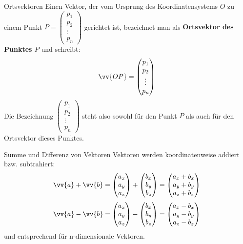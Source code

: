\begin{frame}{Ortsvektoren}
	Einen Vektor, der vom Ursprung des Koordinatensystems $O$ zu einem Punkt $P=\begin{pmatrix}p_1 \\ p_2 \\ \vdots \\ p_n \end{pmatrix}$ gerichtet ist, bezeichnet man als \textbf{Ortsvektor des Punktes $P$} und schreibt:
	\[
		\vv{OP} = \begin{pmatrix}
		p_1 \\ p_2 \\ \vdots \\ p_n
		\end{pmatrix}
	\]
	Die Bezeichnung $\begin{pmatrix}
	p_1 \\ p_2 \\ \vdots \\ p_n
	\end{pmatrix}$
	steht also sowohl für den Punkt $P$ als auch für den Ortsvektor dieses Punktes.
\end{frame}


\begin{frame}{Summe und Differenz von Vektoren}
	Vektoren werden koordinatenweise addiert bzw. subtrahiert:
	\[
	\vv{a} + \vv{b} = \begin{pmatrix} a_x \\ a_y \\ a_z
	\end{pmatrix} + \begin{pmatrix} b_x \\ b_y \\ b_z
	\end{pmatrix} = \begin{pmatrix} a_x + b_x \\ a_y + b_y \\ a_z + b_z
	\end{pmatrix}
	\]
		\[
		\vv{a} - \vv{b} = \begin{pmatrix} a_x \\ a_y \\ a_z
		\end{pmatrix} - \begin{pmatrix} b_x \\ b_y \\ b_z
		\end{pmatrix} = \begin{pmatrix} a_x - b_x \\ a_y - b_y \\ a_z - b_z
		\end{pmatrix}
		\]
	und entsprechend für n-dimensionale Vektoren.	
\end{frame}

